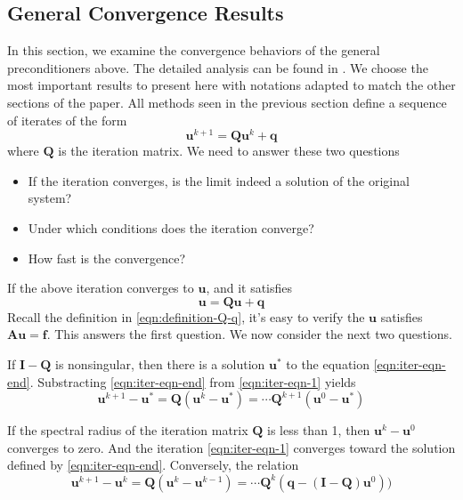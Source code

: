 \subsection{General Convergence Results}
\label{section:convergence-analysis}
In this section, we examine the convergence behaviors of the general preconditioners above. The detailed analysis can be found in \cite{doi:10.1137/1.9780898718003}. We choose the most important results to present here with notations adapted to match the other sections of the paper.
All methods seen in the previous section define a sequence of iterates of the form
\begin{equation}
    \boldsymbol{u}^{k+1} = \boldsymbol{Q}\boldsymbol{u}^k + \boldsymbol{q}
    \label{eqn:iter-eqn-1}
\end{equation}
where $\boldsymbol{Q}$ is the iteration matrix. We need to answer these two questions
\begin{itemize}
    \item If the iteration converges, is the limit indeed a solution of the original system?
    \item Under which conditions does the iteration converge?
    \item How fast is the convergence?
\end{itemize}
If the above iteration converges to $\boldsymbol{u}$, and it satisfies
\begin{equation}
    \boldsymbol{u} = \boldsymbol{Q}\boldsymbol{u} + \boldsymbol{q}
    \label{eqn:iter-eqn-end}
\end{equation}
Recall the definition in \autoref{eqn:definition-Q-q}, it's easy to verify the $\boldsymbol{u}$ satisfies $\boldsymbol{A}\boldsymbol{u}= \boldsymbol{f}$. This answers the first question. We now consider the next two questions.

If $\boldsymbol{I} - \boldsymbol{Q}$ is nonsingular, then there is a solution $\boldsymbol{u}^*$ to the equation \autoref{eqn:iter-eqn-end}. Substracting \autoref{eqn:iter-eqn-end} from \autoref{eqn:iter-eqn-1} yields
\begin{equation}
    \boldsymbol{u}^{k+1} - \boldsymbol{u}^* = \boldsymbol{Q}(\boldsymbol{u}^k - \boldsymbol{u}^*) = \cdots \boldsymbol{Q}^{k+1}(\boldsymbol{u}^0 - \boldsymbol{u}^*)
\end{equation}



If the spectral radius of the iteration matrix $\boldsymbol{Q}$ is less than 1, then $\boldsymbol{u}^k - \boldsymbol{u}^0$ converges to zero. And the iteration \autoref{eqn:iter-eqn-1} converges toward the solution defined by \autoref{eqn:iter-eqn-end}. Conversely, the relation
\begin{equation}
    \boldsymbol{u}^{k+1} - \boldsymbol{u}^k = \boldsymbol{Q}(\boldsymbol{u}^{k} - \boldsymbol{u}^{k-1}) = \cdots \boldsymbol{Q}^{k} (\boldsymbol{q} - (\boldsymbol{I} - \boldsymbol{Q})\boldsymbol{u}^0))
\end{equation}

